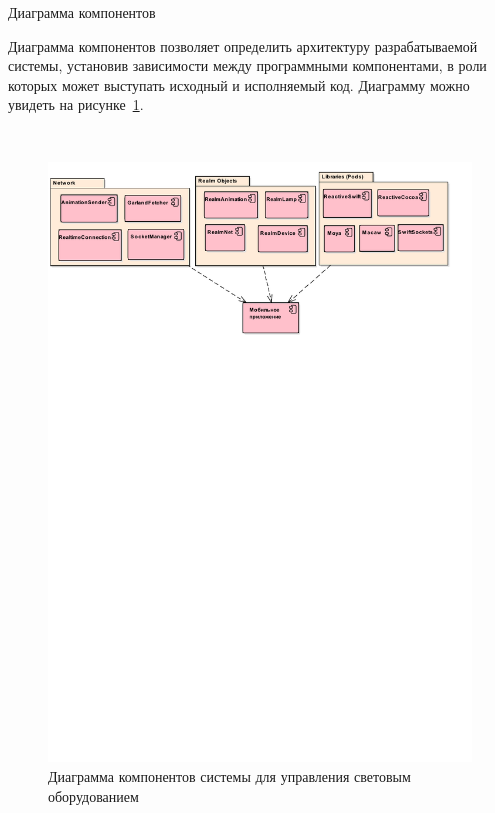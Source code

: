 \subsubsection{} Диаграмма компонентов
\label{sec:develop:umlDiagrams:component}

Диаграмма компонентов позволяет определить архитектуру разрабатываемой системы, установив зависимости между программными компонентами, в роли которых может выступать исходный  и исполняемый код. Диаграмму можно увидеть на рисунке~\ref{fig:develop:umlDiagrams:component}.

~
\begin{figure}[H]
\centering
	\includegraphics[scale=0.8]{figures/diagrams/uml_component.pdf}
	\caption{Диаграмма компонентов системы для управления световым оборудованием}
	\label{fig:develop:umlDiagrams:component}
\end{figure}

